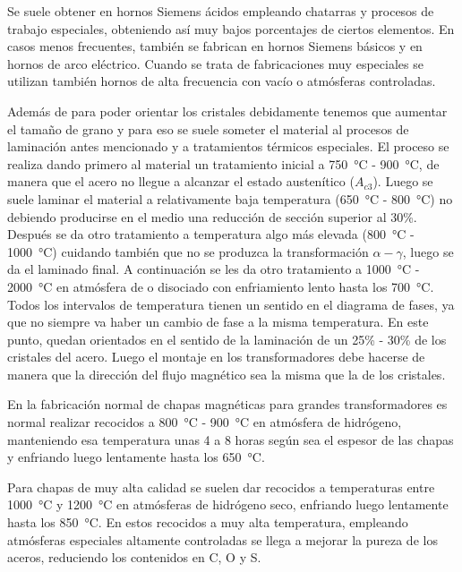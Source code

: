 \documentclass[12pt,a4paper]{article}
\begin{document}
Se suele obtener en hornos Siemens ácidos empleando chatarras y procesos de trabajo especiales, obteniendo así muy bajos porcentajes de ciertos elementos. En casos menos frecuentes, también se fabrican en hornos Siemens básicos y en hornos de arco eléctrico. Cuando se trata de fabricaciones muy especiales se utilizan también hornos de alta frecuencia con vacío o atmósferas controladas.

Además de para poder orientar los cristales debidamente tenemos que aumentar el tamaño de grano y para eso se suele someter el material al procesos de laminación antes mencionado y a tratamientos térmicos especiales. El proceso se realiza dando primero al material un tratamiento inicial a \SI{750}{\celsius} - \SI{900}{\celsius}, de manera que el acero no llegue a alcanzar el estado austenítico ($A_{c3}$). Luego se suele laminar el material a relativamente baja temperatura (\SI{650}{\celsius} - \SI{800}{\celsius}) no debiendo producirse en el medio una reducción de sección superior al 30\%. Después se da otro tratamiento a temperatura algo más elevada (\SI{800}{\celsius} - \SI{1000}{\celsius}) cuidando también que no se produzca la transformación $\alpha-\gamma$, luego se da el laminado final. A continuación se les da otro tratamiento a \SI{1 000}{\celsius} - \SI{2 000}{\celsius} en atmósfera de  o  disociado con enfriamiento lento hasta los \SI{700}{\celsius}. Todos los intervalos de temperatura tienen un sentido en el diagrama de fases, ya que no siempre va haber un cambio de fase a la misma temperatura. En este punto, quedan orientados en el sentido de la laminación de un 25\% - 30\% de los cristales del acero. Luego el montaje en los transformadores debe hacerse de manera que la dirección del flujo magnético sea la misma que la de los cristales.

En la fabricación normal de chapas magnéticas para grandes transformadores es normal realizar recocidos a \SI{800}{\celsius} - \SI{900}{\celsius} en atmósfera de hidrógeno, manteniendo esa temperatura unas 4 a 8 horas según sea el espesor de las chapas y enfriando luego lentamente hasta los \SI{650}{\celsius}.

Para chapas de muy alta calidad se suelen dar recocidos a temperaturas entre \SI{1 000}{\celsius} y \SI{1 200}{\celsius} en atmósferas de hidrógeno seco, enfriando luego lentamente hasta los \SI{850}{\celsius}. En estos recocidos a muy alta temperatura, empleando atmósferas especiales altamente controladas se llega a mejorar la pureza de los aceros, reduciendo los contenidos en C, O y S.
\end{document}
